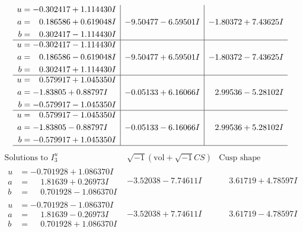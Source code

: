 \documentclass[1p]{elsarticle_modified}
\theoremstyle{definition}
\newcommand{\I}{\sqrt{-1}}
\begin{document}
$$\begin{array}{c|c|c}
\begin{aligned}
u &= -0.302417 + 1.114430 I \\
a &= \phantom{-}0.186586 + 0.619048 I \\
b &= \phantom{-}0.302417 - 1.114430 I\end{aligned}
 & -9.50477 - 6.59501 I & -1.80372 + 7.43625 I \\ \hline\begin{aligned}
u &= -0.302417 - 1.114430 I \\
a &= \phantom{-}0.186586 - 0.619048 I \\
b &= \phantom{-}0.302417 + 1.114430 I\end{aligned}
 & -9.50477 + 6.59501 I & -1.80372 - 7.43625 I \\ \hline\begin{aligned}
u &= \phantom{-}0.579917 + 1.045350 I \\
a &= -1.83805 + 0.88797 I \\
b &= -0.579917 - 1.045350 I\end{aligned}
 & -0.05133 + 6.16066 I & \phantom{-}2.99536 - 5.28102 I \\ \hline\begin{aligned}
u &= \phantom{-}0.579917 - 1.045350 I \\
a &= -1.83805 - 0.88797 I \\
b &= -0.579917 + 1.045350 I\end{aligned}
 & -0.05133 - 6.16066 I & \phantom{-}2.99536 + 5.28102 I\\
 \hline 
 \end{array}$$\newpage$$\begin{array}{c|c|c}  
\text{Solutions to }I^u_{3}& \I (\text{vol} + \sqrt{-1}CS) & \text{Cusp shape}\\
 \hline 
\begin{aligned}
u &= -0.701928 + 1.086370 I \\
a &= \phantom{-}1.81639 + 0.26973 I \\
b &= \phantom{-}0.701928 - 1.086370 I\end{aligned}
 & -3.52038 - 7.74611 I & \phantom{-}3.61719 + 4.78597 I \\ \hline\begin{aligned}
u &= -0.701928 - 1.086370 I \\
a &= \phantom{-}1.81639 - 0.26973 I \\
b &= \phantom{-}0.701928 + 1.086370 I\end{aligned}
 & -3.52038 + 7.74611 I & \phantom{-}3.61719 - 4.78597 I \\ \hline\begin{aligned}

\end{aligned}
\end{array}$$
\end{document}
